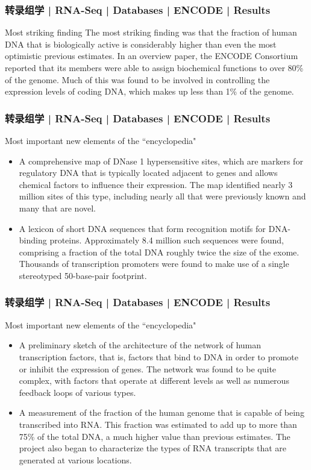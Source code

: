 \begin{frame}
  \frametitle{转录组学 | RNA-Seq | Databases | ENCODE | Results}
  \begin{block}{Most striking finding}
    The most striking finding was that the fraction of human DNA that is biologically active is considerably higher than even the most optimistic previous estimates. In an overview paper, the ENCODE Consortium reported that its members were able to assign biochemical functions to over 80\% of the genome. Much of this was found to be involved in controlling the expression levels of coding DNA, which makes up less than 1\% of the genome.
  \end{block}
\end{frame}

\begin{frame}
  \frametitle{转录组学 | RNA-Seq | Databases | ENCODE | Results}
  \begin{block}{Most important new elements of the ``encyclopedia"}
    \begin{itemize}
      \item A comprehensive map of DNase 1 hypersensitive sites, which are markers for regulatory DNA that is typically located adjacent to genes and allows chemical factors to influence their expression. The map identified nearly 3 million sites of this type, including nearly all that were previously known and many that are novel.
      \item A lexicon of short DNA sequences that form recognition motifs for DNA-binding proteins. Approximately 8.4 million such sequences were found, comprising a fraction of the total DNA roughly twice the size of the exome. Thousands of transcription promoters were found to make use of a single stereotyped 50-base-pair footprint.
    \end{itemize}
  \end{block}
\end{frame}

\begin{frame}
  \frametitle{转录组学 | RNA-Seq | Databases | ENCODE | Results}
  \begin{block}{Most important new elements of the ``encyclopedia"}
    \begin{itemize}
      \item A preliminary sketch of the architecture of the network of human transcription factors, that is, factors that bind to DNA in order to promote or inhibit the expression of genes. The network was found to be quite complex, with factors that operate at different levels as well as numerous feedback loops of various types.
      \item A measurement of the fraction of the human genome that is capable of being transcribed into RNA. This fraction was estimated to add up to more than 75\% of the total DNA, a much higher value than previous estimates. The project also began to characterize the types of RNA transcripts that are generated at various locations.
    \end{itemize}
  \end{block}
\end{frame}

